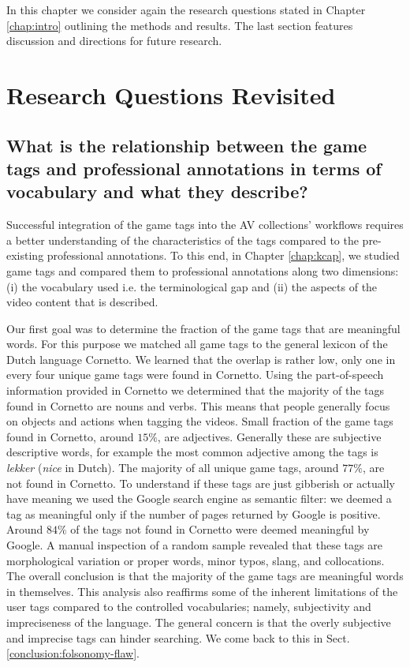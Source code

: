 In this chapter we consider again the research questions stated in Chapter \ref{chap:intro} outlining the methods and results. The last section features discussion and directions for future research.

\section{Research Questions Revisited}
\subsection{What is the relationship between the game tags and professional annotations in terms of vocabulary and what they describe?}
Successful integration of the game tags into the AV collections' workflows requires a better understanding of the characteristics of the tags compared to the pre-existing professional annotations. To this end, in Chapter \ref{chap:kcap}, we studied game tags and compared them to professional annotations along two dimensions: (i) the vocabulary used i.e. the terminological gap and (ii) the aspects of the video content that is described.

Our first goal was to determine the fraction of the game tags that are meaningful words. For this purpose we matched all game tags to the general lexicon of the Dutch language Cornetto. We learned that the overlap is rather low, only one in every four unique game tags were found in Cornetto. Using the part-of-speech information provided in Cornetto we determined that the majority of the tags found in Cornetto are nouns and verbs. This means that people generally focus on objects and actions when tagging the videos. Small fraction of the game tags found in Cornetto, around $15\%$, are adjectives. Generally these are subjective descriptive words, for example the most common adjective among the tags is \textit{lekker} (\textit{nice} in Dutch). The majority of all unique game tags, around $77\%$, are not found in Cornetto. To understand if these tags are just gibberish or actually have meaning we used the Google search engine as semantic filter: we deemed a tag as meaningful only if the number of pages returned by Google is positive. Around $84\%$ of the tags not found in Cornetto were deemed meaningful by Google. A manual inspection of a random sample revealed that these tags are morphological variation or proper words, minor typos, slang, and collocations. The overall conclusion is that the majority of the game tags are meaningful words in themselves. This analysis also reaffirms some of the inherent limitations of the user tags compared to the controlled vocabularies; namely, subjectivity and impreciseness of the language. The general concern is that the overly subjective and imprecise tags can hinder searching. We come back to this in Sect. \ref{conclusion:folsonomy-flaw}.

